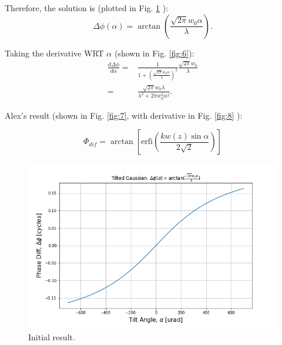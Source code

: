 \documentclass[aps,twoside,secnumarabic,balancelastpage,amsmath,amssymb,nofootinbib,hyperref=pdftex]{revtex4}
\begin{document}
Therefore, the solution is (plotted in Fig. \ref{fig:5} ):
\begin{equation} \Delta \phi(\alpha) =  \arctan (\frac{\sqrt{2 \pi} w_{0} \alpha}{\lambda}).
\end{equation}



Taking the derivative WRT $\alpha$ (shown in Fig. \ref{fig:6}):
\begin{align}
\frac{d \Delta \phi}{d \alpha}  
=&
\frac{1}{1+(\frac{\sqrt{2 \pi} w_{0} \alpha}{\lambda})^2}\frac{\sqrt{2 \pi} w_{0}}{\lambda}
\\=&
\frac{\sqrt{2 \pi}w_0 \lambda}{\lambda^2+2 \pi w_0^2 \alpha^2}.
\end{align}



Alex's result (shown in Fig. \ref{fig:7}, with derivative in Fig. \ref{fig:8} ):

\begin{equation}
\Phi_{dif} = \arctan \left[ \text{erfi}(\frac{kw(z) \sin \alpha}{2 \sqrt{2}}) \right] 
\end{equation}	

\clearpage

\begin{figure}
	\centering
		\includegraphics[scale=.65]{tilt-initial}
		\caption{Initial result.}
		\label{fig:5}
\end{figure}
\end{document}
